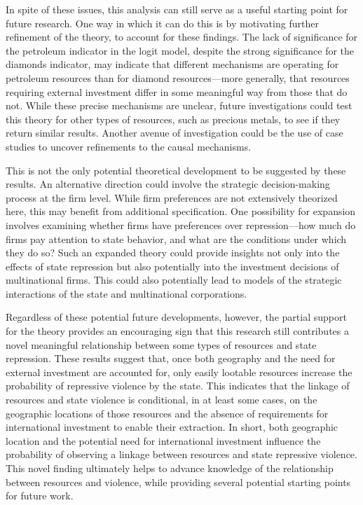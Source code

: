 In spite of these issues, this analysis can still serve as a useful starting point for future research. One way in which it can do this is by motivating further refinement of the theory, to account for these findings. The lack of significance for the petroleum indicator in the logit model, despite the strong significance for the diamonds indicator, may indicate that different mechanisms are operating for petroleum resources than for diamond resources—more generally, that resources requiring external investment differ in some meaningful way from those that do not. While these precise mechanisms are unclear, future investigations could test this theory for other types of resources, such as precious metals, to see if they return similar results. Another avenue of investigation could be the use of case studies to uncover refinements to the causal mechanisms.

This is not the only potential theoretical development to be suggested by these results. An alternative direction could involve the strategic decision-making process at the firm level. While firm preferences are not extensively theorized here, this may benefit from additional specification. One possibility for expansion involves examining whether firms have preferences over repression—how much do firms pay attention to state behavior, and what are the conditions under which they do so? Such an expanded theory could provide insights not only into the effects of state repression but also potentially into the investment decisions of multinational firms. This could also potentially lead to models of the strategic interactions of the state and multinational corporations. 

Regardless of these potential future developments, however, the partial support for the theory provides an encouraging sign that this research still contributes a novel meaningful relationship between some types of resources and state repression. These results suggest that, once both geography and the need for external investment are accounted for, only easily lootable resources increase the probability of repressive violence by the state. This indicates that the linkage of resources and state violence is conditional, in at least some cases, on the geographic locations of those resources and the absence of requirements for international investment to enable their extraction. In short, both geographic location and the potential need for international investment influence the probability of observing a linkage between resources and state repressive violence. This novel finding ultimately helps to advance knowledge of the relationship between resources and violence, while providing several potential starting points for future work.

